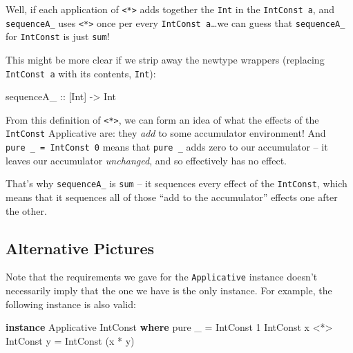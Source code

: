 \documentclass[]{article}
\newenvironment{Shaded}{}{}
\newcommand{\DataTypeTok}[1]{\textcolor[rgb]{0.56,0.13,0.00}{#1}}
\newcommand{\DecValTok}[1]{\textcolor[rgb]{0.25,0.63,0.44}{#1}}
\newcommand{\FunctionTok}[1]{\textcolor[rgb]{0.02,0.16,0.49}{#1}}
\newcommand{\KeywordTok}[1]{\textcolor[rgb]{0.00,0.44,0.13}{\textbf{#1}}}
\newcommand{\NormalTok}[1]{#1}
\newcommand{\OperatorTok}[1]{\textcolor[rgb]{0.40,0.40,0.40}{#1}}
\newcommand{\OtherTok}[1]{\textcolor[rgb]{0.00,0.44,0.13}{#1}}
\begin{document}
Well, if each application of \texttt{\textless{}*\textgreater{}} adds together
the \texttt{Int} in the \texttt{IntConst\ a}, and \texttt{sequenceA\_} uses
\texttt{\textless{}*\textgreater{}} once per every \texttt{IntConst\ a}\ldots we
can guess that \texttt{sequenceA\_} for \texttt{IntConst} is just \texttt{sum}!

This might be more clear if we strip away the newtype wrappers (replacing
\texttt{IntConst\ a} with its contents, \texttt{Int}):

\begin{Shaded}
\begin{Highlighting}[]
\OtherTok{sequenceA\_ ::}\NormalTok{ [}\DataTypeTok{Int}\NormalTok{] }\OtherTok{{-}\textgreater{}} \DataTypeTok{Int}
\end{Highlighting}
\end{Shaded}

From this definition of \texttt{\textless{}*\textgreater{}}, we can form an idea
of what the effects of the \texttt{IntConst} Applicative are: they \emph{add} to
some accumulator environment! And \texttt{pure\ \_\ =\ IntConst\ 0} means that
\texttt{pure\ \_} adds zero to our accumulator -- it leaves our accumulator
\emph{unchanged}, and so effectively has no effect.

That's why \texttt{sequenceA\_} is \texttt{sum} -- it sequences every effect of
the \texttt{IntConst}, which means that it sequences all of those ``add to the
accumulator'' effects one after the other.

\subsection{Alternative Pictures}\label{alternative-pictures}

Note that the requirements we gave for the \texttt{Applicative} instance doesn't
necessarily imply that the one we have is the only instance. For example, the
following instance is also valid:

\begin{Shaded}
\begin{Highlighting}[]
\KeywordTok{instance} \DataTypeTok{Applicative} \DataTypeTok{IntConst} \KeywordTok{where}
    \FunctionTok{pure}\NormalTok{ \_                    }\OtherTok{=} \DataTypeTok{IntConst} \DecValTok{1}
    \DataTypeTok{IntConst}\NormalTok{ x }\OperatorTok{\textless{}*\textgreater{}} \DataTypeTok{IntConst}\NormalTok{ y }\OtherTok{=} \DataTypeTok{IntConst}\NormalTok{ (x }\OperatorTok{*}\NormalTok{ y)}
\end{Highlighting}
\end{Shaded}
\end{document}
